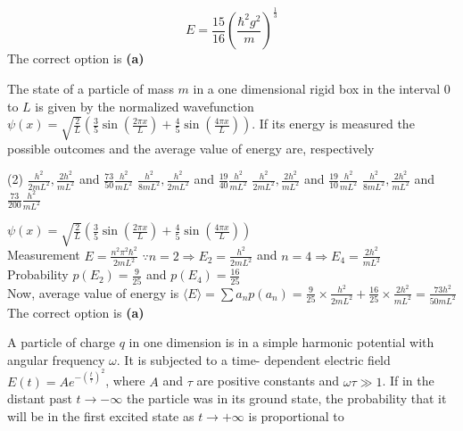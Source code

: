 \begin{enumerate}
\begin{answer}
	$$
	E=\frac{15}{16}\left(\frac{\hbar^{2} g^{2}}{m}\right)^{\frac{1}{3}}
	$$
	The correct option is \textbf{(a)}
\end{answer}
\begin{minipage}{\textwidth}
	\item The state of a particle of mass $m$ in a one dimensional rigid box in the interval 0 to $L$ is given by the normalized wavefunction $\psi(x)=\sqrt{\frac{2}{L}}\left(\frac{3}{5} \sin \left(\frac{2 \pi x}{L}\right)+\frac{4}{5} \sin \left(\frac{4 \pi x}{L}\right)\right)$. If its energy is measured the possible outcomes and the average value of energy are, respectively
\end{minipage}
\begin{tasks}(2)
	\task[\textbf{A.}] $\frac{h^{2}}{2 m L^{2}}, \frac{2 h^{2}}{m L^{2}}$ and $\frac{73}{50} \frac{h^{2}}{m L^{2}}$
	\task[\textbf{B.}] $\frac{h^{2}}{8 m L^{2}}, \frac{h^{2}}{2 m L^{2}}$ and $\frac{19}{40} \frac{h^{2}}{m L^{2}}$
	\task[\textbf{C.}]$\frac{h^{2}}{2 m L^{2}}, \frac{2 h^{2}}{m L^{2}}$ and $\frac{19}{10} \frac{h^{2}}{m L^{2}}$
	\task[\textbf{D.}]$\frac{h^{2}}{8 m L^{2}}, \frac{2 h^{2}}{m L^{2}}$ and $\frac{73}{200} \frac{h^{2}}{m L^{2}}$
\end{tasks}
\begin{answer}
	$\psi(x)=\sqrt{\frac{2}{L}}\left(\frac{3}{5} \sin \left(\frac{2 \pi x}{L}\right)+\frac{4}{5} \sin \left(\frac{4 \pi x}{L}\right)\right)$\\
	Measurement $E=\frac{n^{2} \pi^{2} \hbar^{2}}{2 m L^{2}}$
	$\because n=2 \Rightarrow E_{2}=\frac{h^{2}}{2 m L^{2}}$ and $n=4 \Rightarrow E_{4}=\frac{2 h^{2}}{m L^{2}}$\\
	Probability $p\left(E_{2}\right)=\frac{9}{25}$ and $p\left(E_{4}\right)=\frac{16}{25}$\\
	Now, average value of energy is
	$\langle E\rangle=\sum a_{n} p\left(a_{n}\right)=\frac{9}{25} \times \frac{h^{2}}{2 m L^{2}}+\frac{16}{25} \times \frac{2 h^{2}}{m L^{2}}=\frac{73 h^{2}}{50 m L^{2}}$\\
	The correct option is \textbf{(a)}
\end{answer}
\begin{minipage}{\textwidth}
	\item A particle of charge $q$ in one dimension is in a simple harmonic potential with angular frequency $\omega .$ It is subjected to a time- dependent electric field $E(t)=A e^{-\left(\frac{t}{\tau}\right)^{2}}$, where $A$ and $\tau$ are positive constants and $\omega \tau \gg 1$. If in the distant past $t \rightarrow-\infty$ the particle was in its ground state, the probability that it will be in the first excited state as $t \rightarrow+\infty$ is proportional to

\end{minipage}
\end{enumerate}
